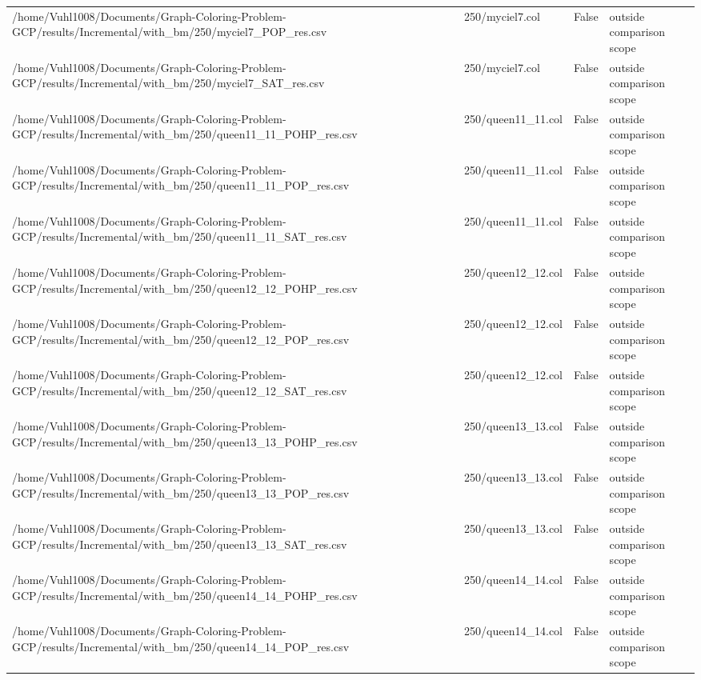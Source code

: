 \begin{table}[htbp]
\begin{tabular}{llll}
/home/Vuhl1008/Documents/Graph-Coloring-Problem-GCP/results/Incremental/with\_bm/250/myciel7\_POP\_res.csv & 250/myciel7.col & False & outside comparison scope \\
/home/Vuhl1008/Documents/Graph-Coloring-Problem-GCP/results/Incremental/with\_bm/250/myciel7\_SAT\_res.csv & 250/myciel7.col & False & outside comparison scope \\
/home/Vuhl1008/Documents/Graph-Coloring-Problem-GCP/results/Incremental/with\_bm/250/queen11\_11\_POHP\_res.csv & 250/queen11\_11.col & False & outside comparison scope \\
/home/Vuhl1008/Documents/Graph-Coloring-Problem-GCP/results/Incremental/with\_bm/250/queen11\_11\_POP\_res.csv & 250/queen11\_11.col & False & outside comparison scope \\
/home/Vuhl1008/Documents/Graph-Coloring-Problem-GCP/results/Incremental/with\_bm/250/queen11\_11\_SAT\_res.csv & 250/queen11\_11.col & False & outside comparison scope \\
/home/Vuhl1008/Documents/Graph-Coloring-Problem-GCP/results/Incremental/with\_bm/250/queen12\_12\_POHP\_res.csv & 250/queen12\_12.col & False & outside comparison scope \\
/home/Vuhl1008/Documents/Graph-Coloring-Problem-GCP/results/Incremental/with\_bm/250/queen12\_12\_POP\_res.csv & 250/queen12\_12.col & False & outside comparison scope \\
/home/Vuhl1008/Documents/Graph-Coloring-Problem-GCP/results/Incremental/with\_bm/250/queen12\_12\_SAT\_res.csv & 250/queen12\_12.col & False & outside comparison scope \\
/home/Vuhl1008/Documents/Graph-Coloring-Problem-GCP/results/Incremental/with\_bm/250/queen13\_13\_POHP\_res.csv & 250/queen13\_13.col & False & outside comparison scope \\
/home/Vuhl1008/Documents/Graph-Coloring-Problem-GCP/results/Incremental/with\_bm/250/queen13\_13\_POP\_res.csv & 250/queen13\_13.col & False & outside comparison scope \\
/home/Vuhl1008/Documents/Graph-Coloring-Problem-GCP/results/Incremental/with\_bm/250/queen13\_13\_SAT\_res.csv & 250/queen13\_13.col & False & outside comparison scope \\
/home/Vuhl1008/Documents/Graph-Coloring-Problem-GCP/results/Incremental/with\_bm/250/queen14\_14\_POHP\_res.csv & 250/queen14\_14.col & False & outside comparison scope \\
/home/Vuhl1008/Documents/Graph-Coloring-Problem-GCP/results/Incremental/with\_bm/250/queen14\_14\_POP\_res.csv & 250/queen14\_14.col & False & outside comparison scope \\

\end{tabular}
\end{table}
